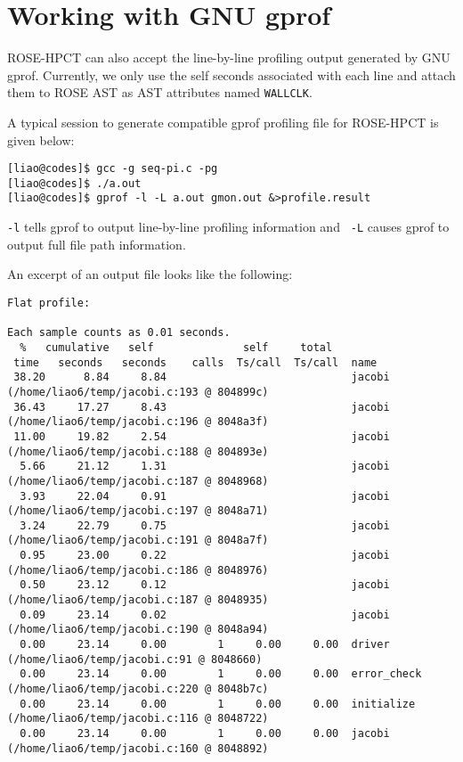 \section{Working with GNU gprof}
ROSE-HPCT can also accept the line-by-line profiling output generated by
GNU gprof. 
Currently, we only use the self seconds associated with each line
and attach them to ROSE AST as AST attributes named {\tt WALLCLK}.

A typical session to generate compatible gprof profiling file for ROSE-HPCT
is given below:
\begin{verbatim}
[liao@codes]$ gcc -g seq-pi.c -pg
[liao@codes]$ ./a.out
[liao@codes]$ gprof -l -L a.out gmon.out &>profile.result
\end{verbatim}

{\tt -l} tells gprof to output line-by-line profiling information and {\tt
-L} causes gprof to output full file path information. 

An excerpt of an output file looks like the following:
{\scriptsize
\begin{verbatim}
Flat profile:

Each sample counts as 0.01 seconds.
  %   cumulative   self              self     total
 time   seconds   seconds    calls  Ts/call  Ts/call  name
 38.20      8.84     8.84                             jacobi (/home/liao6/temp/jacobi.c:193 @ 804899c)
 36.43     17.27     8.43                             jacobi (/home/liao6/temp/jacobi.c:196 @ 8048a3f)
 11.00     19.82     2.54                             jacobi (/home/liao6/temp/jacobi.c:188 @ 804893e)
  5.66     21.12     1.31                             jacobi (/home/liao6/temp/jacobi.c:187 @ 8048968)
  3.93     22.04     0.91                             jacobi (/home/liao6/temp/jacobi.c:197 @ 8048a71)
  3.24     22.79     0.75                             jacobi (/home/liao6/temp/jacobi.c:191 @ 8048a7f)
  0.95     23.00     0.22                             jacobi (/home/liao6/temp/jacobi.c:186 @ 8048976)
  0.50     23.12     0.12                             jacobi (/home/liao6/temp/jacobi.c:187 @ 8048935)
  0.09     23.14     0.02                             jacobi (/home/liao6/temp/jacobi.c:190 @ 8048a94)
  0.00     23.14     0.00        1     0.00     0.00  driver (/home/liao6/temp/jacobi.c:91 @ 8048660)
  0.00     23.14     0.00        1     0.00     0.00  error_check (/home/liao6/temp/jacobi.c:220 @ 8048b7c)
  0.00     23.14     0.00        1     0.00     0.00  initialize (/home/liao6/temp/jacobi.c:116 @ 8048722)
  0.00     23.14     0.00        1     0.00     0.00  jacobi (/home/liao6/temp/jacobi.c:160 @ 8048892)
\end{verbatim}
}

